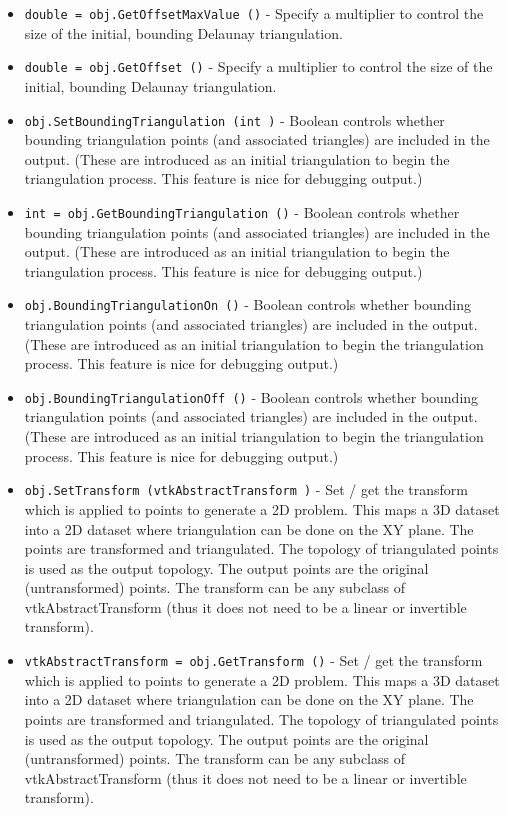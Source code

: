 \begin{itemize}
\item  \verb|double = obj.GetOffsetMaxValue ()| -  Specify a multiplier to control the size of the initial, bounding
 Delaunay triangulation.

\item  \verb|double = obj.GetOffset ()| -  Specify a multiplier to control the size of the initial, bounding
 Delaunay triangulation.

\item  \verb|obj.SetBoundingTriangulation (int )| -  Boolean controls whether bounding triangulation points (and associated
 triangles) are included in the output. (These are introduced as an
 initial triangulation to begin the triangulation process. This feature
 is nice for debugging output.)

\item  \verb|int = obj.GetBoundingTriangulation ()| -  Boolean controls whether bounding triangulation points (and associated
 triangles) are included in the output. (These are introduced as an
 initial triangulation to begin the triangulation process. This feature
 is nice for debugging output.)

\item  \verb|obj.BoundingTriangulationOn ()| -  Boolean controls whether bounding triangulation points (and associated
 triangles) are included in the output. (These are introduced as an
 initial triangulation to begin the triangulation process. This feature
 is nice for debugging output.)

\item  \verb|obj.BoundingTriangulationOff ()| -  Boolean controls whether bounding triangulation points (and associated
 triangles) are included in the output. (These are introduced as an
 initial triangulation to begin the triangulation process. This feature
 is nice for debugging output.)

\item  \verb|obj.SetTransform (vtkAbstractTransform )| -  Set / get the transform which is applied to points to generate a
 2D problem.  This maps a 3D dataset into a 2D dataset where
 triangulation can be done on the XY plane.  The points are
 transformed and triangulated.  The topology of triangulated
 points is used as the output topology.  The output points are the
 original (untransformed) points.  The transform can be any
 subclass of vtkAbstractTransform (thus it does not need to be a
 linear or invertible transform).

\item  \verb|vtkAbstractTransform = obj.GetTransform ()| -  Set / get the transform which is applied to points to generate a
 2D problem.  This maps a 3D dataset into a 2D dataset where
 triangulation can be done on the XY plane.  The points are
 transformed and triangulated.  The topology of triangulated
 points is used as the output topology.  The output points are the
 original (untransformed) points.  The transform can be any
 subclass of vtkAbstractTransform (thus it does not need to be a
 linear or invertible transform).


\end{itemize}
